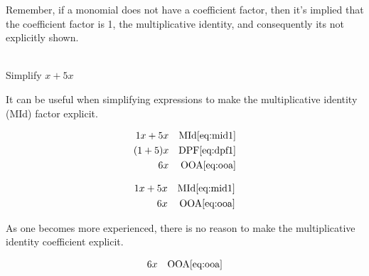 \documentclass[20150903-160354-rs2.2-MarksMathNotebook.tex]{subfiles}
\begin{document}
\begin{remark}
Remember, if a monomial does not have a coefficient factor, then it's implied that the coefficient factor is 1, the multiplicative identity, and consequently its not explicitly shown.
\end{remark}

\begin{example}[id:20141121-185558] \label{20141121-185558} \hfill \\

Simplify $x+5x$

\soln

\solnsteps

It can be useful when simplifying expressions to make the multiplicative identity (MId) factor explicit.

\begin{align*}
1x+5x && \text{MId} \eqref{eq:mid1} \\
(1+5)x && \text{DPF} \eqref{eq:dpf1} \\
6x && \text{OOA} \eqref{eq:ooa}
\end{align*}

\soln

\lesssteps
\begin{align*}
1x+5x && \text{MId} \eqref{eq:mid1} \\
6x && \text{OOA} \eqref{eq:ooa}
\end{align*}

As one becomes more experienced, there is no reason to make the multiplicative identity coefficient explicit.

\soln

\lesssteps
\begin{align*}
6x && \text{OOA} \eqref{eq:ooa}
\end{align*}

\end{example}
\end{document}
